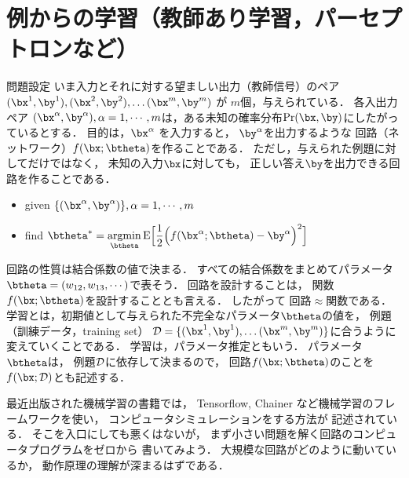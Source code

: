 \documentclass[a4paper,11pt]{jarticle}
\begin{document}
\section{例からの学習（教師あり学習，パーセプトロンなど）\cite{rumelhart86b,amari88c,sgeman92a}}
%      
\begin{itembox}[l]{問題設定}
      いま入力とそれに対する望ましい出力（教師信号）のペア
      $
      (\bx^1, \by^1),
      (\bx^2, \by^2), \dots
      (\bx^m, \by^m)$ が $m$個，与えられている．
各入出力ペア $(\bx^\alpha, \by^\alpha), \alpha=1,\cdots,m$は，ある未知の確率分布$\Pr(\bx,\by)$にしたがっているとする．
      目的は，$\bx^\alpha$ を入力すると，
      $\by^\alpha$を出力するような
      回路（ネットワーク）$f(\bx;\btheta)$を作ることである．
      ただし，与えられた例題に対してだけではなく，
      未知の入力$\bx$に対しても，
      正しい答え$\by$を出力できる回路を作ることである．


\begin{itemize}
\item given $ \{ (\bx^\alpha, \by^\alpha) \}, \alpha=1,\cdots,m $
 \item find
       $ \btheta^* = {\displaystyle \mathop{\rm argmin}_{\btheta}
       {\rm E} \Bigl [   \frac{1}{2} \Bigl ( f(\bx^\alpha;\btheta) -
       \by^\alpha \Bigr )^2  \Bigr ] }  $
\end{itemize}
\end{itembox}

回路の性質は結合係数の値で決まる．
すべての結合係数をまとめてパラメータ$\btheta=(w_{12},w_{13},\cdots)$で表そう．
回路を設計することは，
関数$f(\bx;\btheta)$を設計することとも言える．
したがって
回路$\approx$関数である．
学習とは，初期値として与えられた不完全なパラメータ$\btheta$の値を，
例題（訓練データ，training set）
${\cal D} = \{
      (\bx^1, \by^1), \dots
      (\bx^m, \by^m)
      \}
      $に合うように変えていくことである．
学習は，パラメータ推定ともいう．
パラメータ$\btheta$は，
例題${\cal D}$に依存して決まるので，
回路$f(\bx;\btheta)$のことを $f(\bx;{\cal D})$とも記述する．


最近出版された機械学習の書籍では，
Tensorflow, Chainer など機械学習のフレームワークを使い，
コンピュータシミュレーションをする方法が
記述されている．
そこを入口にしても悪くはないが，
まず小さい問題を解く回路のコンピュータプログラムをゼロから
書いてみよう．
大規模な回路がどのように動いているか，
動作原理の理解が深まるはずである．
\end{document}
